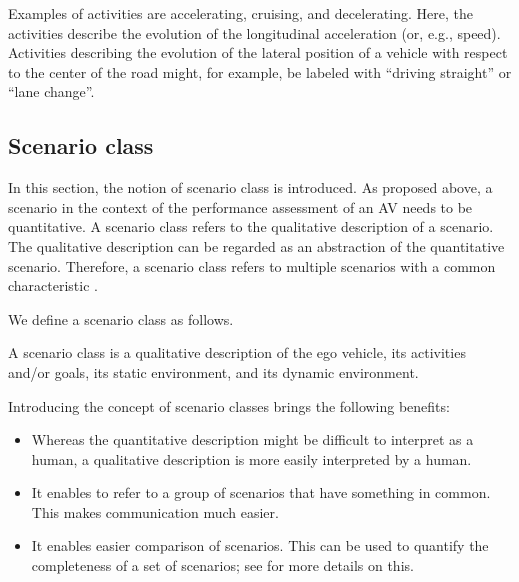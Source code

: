 Examples of activities are accelerating, cruising, and decelerating. Here, the activities describe the evolution of the longitudinal acceleration (or, e.g., speed). Activities describing the evolution of the lateral position of a vehicle with respect to the center of the road might, for example, be labeled with ``driving straight'' or ``lane change''.



\subsection{Scenario class}
\label{sec:scenario class}

In this section, the notion of scenario class is introduced. As proposed above, a scenario in the context of the performance assessment of an AV needs to be quantitative. 
A scenario class refers to the qualitative description of a scenario.
The qualitative description can be regarded as an abstraction of the quantitative scenario. Therefore, a scenario class refers to multiple scenarios with a common characteristic \cite{elrofai2018scenario}.

We define a scenario class as follows.
\begin{definition} \label{def:scenario class}
	A scenario class is a qualitative description of the ego vehicle, its activities and/or goals, its static environment, and its dynamic environment.
\end{definition}

Introducing the concept of scenario classes brings the following benefits:
\begin{itemize}
	\item Whereas the quantitative description might be difficult to interpret as a human, a qualitative description is more easily interpreted by a human.
	\item It enables to refer to a group of scenarios that have something in common. This makes communication much easier.
	\item It enables easier comparison of scenarios. This can be used to quantify the completeness of a set of scenarios; see \cite{degelder2019completeness} for more details on this.
\end{itemize}

